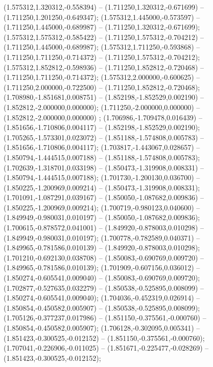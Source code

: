 (1.575312,1.320312,-0.558394) -- (1.711250,1.320312,-0.671699) -- (1.711250,1.201250,-0.649347);
 (1.575312,1.445000,-0.573597) -- (1.711250,1.445000,-0.689987) -- (1.711250,1.320312,-0.671699);
 (1.575312,1.575312,-0.585422) -- (1.711250,1.575312,-0.704212) -- (1.711250,1.445000,-0.689987);
 (1.575312,1.711250,-0.593868) -- (1.711250,1.711250,-0.714372) -- (1.711250,1.575312,-0.704212);
 (1.575312,1.852812,-0.598936) -- (1.711250,1.852812,-0.720468) -- (1.711250,1.711250,-0.714372);
 (1.575312,2.000000,-0.600625) -- (1.711250,2.000000,-0.722500) -- (1.711250,1.852812,-0.720468);
 (1.708980,-1.851681,0.008751) -- (1.852198,-1.852529,0.002190) -- (1.852812,-2.000000,0.000000);
 (1.711250,-2.000000,0.000000) -- (1.852812,-2.000000,0.000000) ;
 (1.706986,-1.709478,0.016439) -- (1.851656,-1.710806,0.004117) -- (1.852198,-1.852529,0.002190);
 (1.705265,-1.573301,0.023072) -- (1.851188,-1.574808,0.005783) -- (1.851656,-1.710806,0.004117);
 (1.703817,-1.443067,0.028657) -- (1.850794,-1.444515,0.007188) -- (1.851188,-1.574808,0.005783);
 (1.702639,-1.318701,0.033198) -- (1.850473,-1.319908,0.008331) -- (1.850794,-1.444515,0.007188);
 (1.701730,-1.200130,0.036700) -- (1.850225,-1.200969,0.009214) -- (1.850473,-1.319908,0.008331);
 (1.701091,-1.087291,0.039167) -- (1.850050,-1.087682,0.009836) -- (1.850225,-1.200969,0.009214);
 (1.700719,-0.980123,0.040600) -- (1.849949,-0.980031,0.010197) -- (1.850050,-1.087682,0.009836);
 (1.700615,-0.878572,0.041001) -- (1.849920,-0.878003,0.010298) -- (1.849949,-0.980031,0.010197);
 (1.700778,-0.782589,0.040371) -- (1.849965,-0.781586,0.010139) -- (1.849920,-0.878003,0.010298);
 (1.701210,-0.692130,0.038708) -- (1.850083,-0.690769,0.009720) -- (1.849965,-0.781586,0.010139);
 (1.701909,-0.607156,0.036012) -- (1.850274,-0.605541,0.009040) -- (1.850083,-0.690769,0.009720);
 (1.702877,-0.527635,0.032279) -- (1.850538,-0.525895,0.008099) -- (1.850274,-0.605541,0.009040);
 (1.704036,-0.452319,0.026914) -- (1.850854,-0.450582,0.005907) -- (1.850538,-0.525895,0.008099);
 (1.705126,-0.377237,0.017986) -- (1.851150,-0.375561,-0.000760) -- (1.850854,-0.450582,0.005907);
 (1.706128,-0.302095,0.005341) -- (1.851423,-0.300525,-0.012152) -- (1.851150,-0.375561,-0.000760);
 (1.707041,-0.226906,-0.011025) -- (1.851671,-0.225477,-0.028269) -- (1.851423,-0.300525,-0.012152);
